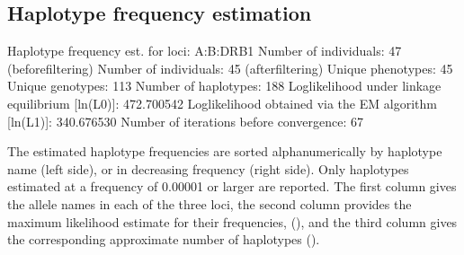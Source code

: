 \documentclass[letterpaper,10pt,english,openany,oneside]{sphinxmanual}
\begin{document}
\subsection{Haplotype frequency estimation}
\label{\detokenize{docs/guide-chapter-instructions:haplotype-frequency-estimation}}\label{\detokenize{docs/guide-chapter-instructions:instructions-haplotype-freqs}}
\begin{sphinxVerbatim}[commandchars=\\\{\}]
Haplotype frequency est. for loci: A:B:DRB1
\PYGZhy{}\PYGZhy{}\PYGZhy{}\PYGZhy{}\PYGZhy{}\PYGZhy{}\PYGZhy{}\PYGZhy{}\PYGZhy{}\PYGZhy{}\PYGZhy{}\PYGZhy{}\PYGZhy{}\PYGZhy{}\PYGZhy{}\PYGZhy{}\PYGZhy{}\PYGZhy{}\PYGZhy{}\PYGZhy{}\PYGZhy{}\PYGZhy{}\PYGZhy{}\PYGZhy{}\PYGZhy{}\PYGZhy{}\PYGZhy{}\PYGZhy{}\PYGZhy{}\PYGZhy{}\PYGZhy{}\PYGZhy{}\PYGZhy{}\PYGZhy{}\PYGZhy{}\PYGZhy{}\PYGZhy{}\PYGZhy{}\PYGZhy{}\PYGZhy{}\PYGZhy{}\PYGZhy{}\PYGZhy{}
Number of individuals: 47 (before\PYGZhy{}filtering)
Number of individuals: 45 (after\PYGZhy{}filtering)
Unique phenotypes: 45
Unique genotypes: 113
Number of haplotypes: 188
Loglikelihood under linkage equilibrium [ln(L\PYGZus{}0)]: \PYGZhy{}472.700542
Loglikelihood obtained via the EM algorithm [ln(L\PYGZus{}1)]: \PYGZhy{}340.676530
Number of iterations before convergence: 67
\end{sphinxVerbatim}

\sphinxAtStartPar
The estimated haplotype frequencies are sorted alphanumerically by
haplotype name (left side), or in decreasing frequency (right side).
Only haplotypes estimated at a frequency of 0.00001 or larger are
reported. The first column gives the allele names in each of the three
loci, the second column provides the maximum likelihood estimate for
their frequencies, (), and the third column gives the
corresponding approximate number of haplotypes ().
\end{document}
